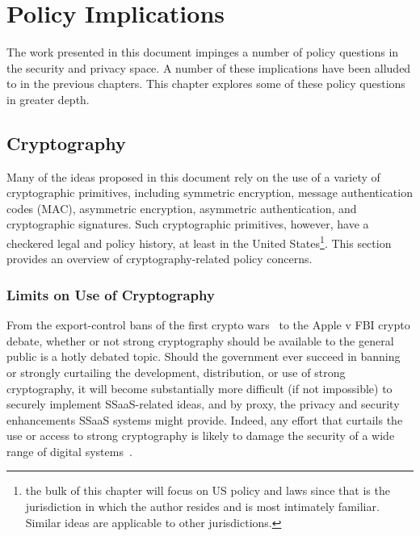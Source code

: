 \chapter{Policy Implications}
\label{chap:policy}

The work presented in this document impinges a number of policy
questions in the security and privacy space. A number of these
implications have been alluded to in the previous chapters. This
chapter explores some of these policy questions in greater depth.

\section{Cryptography}
\label{chap:policy:crypto}

Many of the ideas proposed in this document rely on the use of a
variety of cryptographic primitives, including symmetric encryption,
message authentication codes (MAC), asymmetric encryption, asymmetric
authentication, and cryptographic signatures. Such cryptographic
primitives, however, have a checkered legal and policy history, at
least in the United States\footnote{the bulk of this chapter will
  focus on US policy and laws since that is the jurisdiction in which
  the author resides and is most intimately familiar. Similar ideas
  are applicable to other jurisdictions.}. This section provides an
overview of cryptography-related policy concerns.

\subsection{Limits on Use of Cryptography}
\label{chap:policy:crypto:limits}

From the export-control bans of the first crypto wars~\cite{kehl2015}
to the Apple v FBI crypto debate, whether or not strong cryptography
should be available to the general public is a hotly debated
topic. Should the government ever succeed in banning or strongly
curtailing the development, distribution, or use of strong
cryptography, it will become substantially more difficult (if not
impossible) to securely implement SSaaS-related ideas, and by proxy,
the privacy and security enhancements SSaaS systems might
provide. Indeed, any effort that curtails the use or access to strong
cryptography is likely to damage the security of a wide range of digital
systems~\cite{Abelson2015}.

